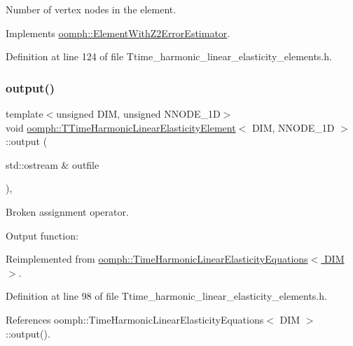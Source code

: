 Number of vertex nodes in the element. 



Implements \hyperlink{classoomph_1_1ElementWithZ2ErrorEstimator_a19495a0e77ef4ff35f15fdf7913b4077}{oomph\+::\+Element\+With\+Z2\+Error\+Estimator}.



Definition at line 124 of file Ttime\+\_\+harmonic\+\_\+linear\+\_\+elasticity\+\_\+elements.\+h.

\mbox{\label{classoomph_1_1TTimeHarmonicLinearElasticityElement_a5f20fab8c4740f48557380a36b86669b}} 
\subsubsection{\texorpdfstring{output()}{output()}\hspace{0.1cm}{\footnotesize\ttfamily [1/4]}}
{\footnotesize\ttfamily template$<$unsigned D\+IM, unsigned N\+N\+O\+D\+E\+\_\+1D$>$ \\
void \hyperlink{classoomph_1_1TTimeHarmonicLinearElasticityElement}{oomph\+::\+T\+Time\+Harmonic\+Linear\+Elasticity\+Element}$<$ D\+IM, N\+N\+O\+D\+E\+\_\+1D $>$\+::output (\begin{DoxyParamCaption}\item[{std\+::ostream \&}]{outfile }\end{DoxyParamCaption})\hspace{0.3cm}{\ttfamily [inline]}, {\ttfamily [virtual]}}



Broken assignment operator. 

Output function\+: 

Reimplemented from \hyperlink{classoomph_1_1TimeHarmonicLinearElasticityEquations_acbc7549f33300563f0a3953782fb4a46}{oomph\+::\+Time\+Harmonic\+Linear\+Elasticity\+Equations$<$ D\+I\+M $>$}.



Definition at line 98 of file Ttime\+\_\+harmonic\+\_\+linear\+\_\+elasticity\+\_\+elements.\+h.



References oomph\+::\+Time\+Harmonic\+Linear\+Elasticity\+Equations$<$ D\+I\+M $>$\+::output().

